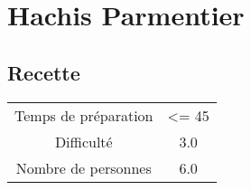 \newpage
\section{Hachis Parmentier}
    \label{sec:Hachis Parmentier}
    \subsection{Recette}
    \vspace{1cm}


    \begin{center}
        \begin{tabular}{c|c}
            Temps de préparation & <= 45 \\
            Difficulté & 3.0 \\
            Nombre de personnes & 6.0 
        \end{tabular}
    \end{center}{}

    \vspace{1cm}
    \hline
    \vspace{1cm}

